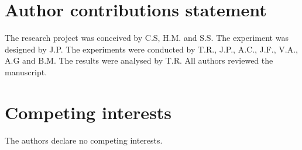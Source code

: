 \documentclass[fleqn,10pt]{wlscirep}
\begin{document}
\section*{Author contributions statement}
The research project was conceived by C.S, H.M. and S.S. The experiment was designed by J.P. The experiments were conducted by  T.R., J.P., A.C., J.F., V.A., A.G and B.M. The results were analysed by T.R. All authors reviewed the manuscript. 

\section*{Competing interests}
The authors declare no competing interests.

\newpage
\appendix

\end{document}

